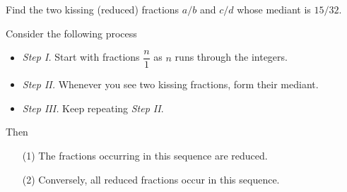 \vspace*{1em}

\begin{example}[in-class]
Find the two kissing (reduced) fractions $a/b$ and $c/d$ whose mediant is $15/32$.
\end{example}

\vspace*{1em}

\begin{theorem}
Consider the following process
\begin{itemize}
\item \emph{Step I.} Start with fractions $\dfrac{n}{1}$ as $n$ runs through the integers.
\item \emph{Step II.} Whenever you see two kissing fractions, form their mediant.
\item \emph{Step III.} Keep repeating \emph{Step II}.
\end{itemize}
Then
\begin{itemize}
\item[(1)] The fractions occurring in this sequence are reduced.
\item[(2)] Conversely, all reduced fractions occur in this sequence.
\end{itemize}
\end{theorem}
